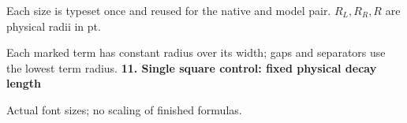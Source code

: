 \documentclass{article}
\newcommand\Mark[1]{\directlua{grid.mark(#1)}}
\begin{document}
\par\medskip
Each size is typeset once and reused for the native and model pair. $R_L,R_R,R$ are physical radii in pt.\par
Each marked term has constant radius over its width; gaps and separators use the lowest term radius.
\newpage
{\Large\bfseries 11. Single square control: fixed physical decay length}\par\medskip
{} Actual font sizes; no scaling of finished formulas.\par\medskip
\end{document}
